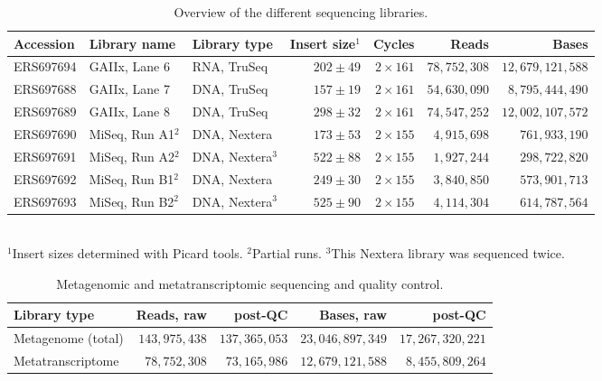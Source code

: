 \documentclass{bmcart}
\begin{document}
\begin{backmatter}
\begin{table}[h!]
\caption{Overview of the different sequencing libraries.}
\begin{tabular}{lllrrrr}
\hline
Accession & Library name & Library type & Insert size$^{1}$ & Cycles & Reads & Bases \\
\hline
ERS697694 & GAIIx, Lane 6 & RNA, TruSeq & $202 \pm 49$ & $2 \times 161$ & $78,752,308$ & $12,679,121,588$ \\
ERS697688 & GAIIx, Lane 7 & DNA, TruSeq & $157 \pm 19$ & $2 \times 161$ & $54,630,090$ & $8,795,444,490$ \\
ERS697689 & GAIIx, Lane 8 & DNA, TruSeq & $298 \pm 32$ & $2 \times 161$ & $74,547,252$ & $12,002,107,572$ \\
ERS697690 & MiSeq, Run A1$^{2}$ & DNA, Nextera & $173 \pm 53$ & $2 \times 155$ & $4,915,698$ & $761,933,190$ \\
ERS697691 & MiSeq, Run A2$^{2}$ & DNA, Nextera$^{3}$ & $522 \pm 88$ & $2 \times 155$ & $1,927,244$ & $298,722,820$ \\
ERS697692 & MiSeq, Run B1$^{2}$ & DNA, Nextera & $249 \pm 30$ & $2 \times 155$ & $3,840,850$ & $573,901,713$ \\
ERS697693 & MiSeq, Run B2$^{2}$ & DNA, Nextera$^{3}$ & $525 \pm 90$ & $2 \times 155$ & $4,114,304$ & $614,787,564$ \\
\hline
\end{tabular}
\\{$^{1}$Insert sizes determined with Picard tools. $^{2}$Partial runs. $^{3}$This Nextera library was sequenced twice.}
\label{tReads}
\end{table}

\begin{table}[h!]
\caption{Metagenomic and metatranscriptomic sequencing and quality control.}
\begin{tabular}{lrrrr}
\hline
Library type & Reads, raw & post-QC & Bases, raw & post-QC\\
\hline
Metagenome (total) & $143,975,438$ & $137,365,053$ & $23,046,897,349$ & $17,267,320,221$ \\
Metatranscriptome & $78,752,308$ & $73,165,986$ & $12,679,121,588$ & $8,455,809,264$ \\
\hline
\end{tabular}
\label{tPostQC}
\end{table}


\end{backmatter}
\end{document}
